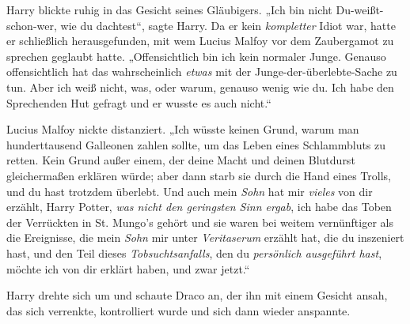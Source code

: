Harry blickte ruhig in das Gesicht seines Gläubigers.
„Ich bin nicht Du-weißt-schon-wer, wie du dachtest“, sagte Harry.
Da er kein \emph{kompletter} Idiot war, hatte er schließlich herausgefunden, mit wem Lucius Malfoy vor dem Zaubergamot zu sprechen geglaubt hatte.
„Offensichtlich bin ich kein normaler Junge. Genauso offensichtlich hat das wahrscheinlich \emph{etwas} mit der Junge-der-überlebte-Sache zu tun. Aber ich weiß nicht, was, oder warum, genauso wenig wie du. Ich habe den Sprechenden Hut gefragt und er wusste es auch nicht.“

Lucius Malfoy nickte distanziert.
„Ich wüsste keinen Grund, warum man hunderttausend Galleonen zahlen sollte, um das Leben eines Schlammbluts zu retten. Kein Grund außer einem, der deine Macht und deinen Blutdurst gleichermaßen erklären würde; aber dann starb sie durch die Hand eines Trolls, und du hast trotzdem überlebt. Und auch mein \emph{Sohn} hat mir \emph{vieles} von dir erzählt, Harry Potter, \emph{was nicht den geringsten Sinn ergab}, ich habe das Toben der Verrückten in St. Mungo’s gehört und sie waren bei weitem vernünftiger als die Ereignisse, die mein \emph{Sohn} mir unter \emph{Veritaserum} erzählt hat, die du inszeniert hast, und den Teil dieses \emph{Tobsuchtsanfalls}, den du \emph{persönlich ausgeführt hast}, möchte ich von dir erklärt haben, und zwar jetzt.“

Harry drehte sich um und schaute Draco an, der ihn mit einem Gesicht ansah, das sich verrenkte, kontrolliert wurde und sich dann wieder anspannte.

